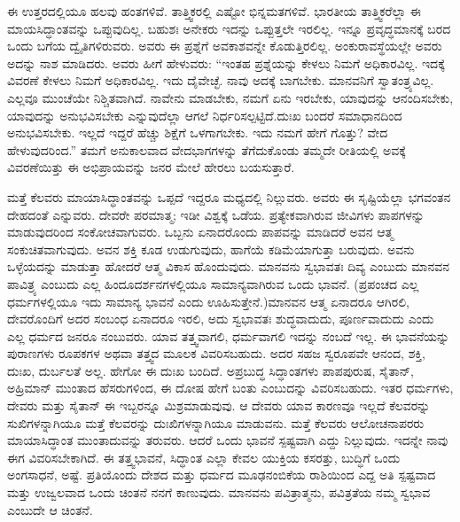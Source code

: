 \vskip 0.2cm 

ಈ ಉತ್ತರದಲ್ಲಿಯೂ ಹಲವು ಹಂತಗಳಿವೆ. ತಾತ್ತ್ವಿಕರಲ್ಲಿ ಎಷ್ಟೋ ಭಿನ್ನಮತಗಳಿವೆ. ಭಾರತೀಯ ತಾತ್ತ್ವಿಕರೆಲ್ಲಾ ಈ ಮಾಯಸಿದ್ಧಾಂತವನ್ನು ಒಪ್ಪುವುದಿಲ್ಲ. ಬಹುಶಃ ಅನೇಕರು ಇದನ್ನು ಒಪ್ಪುತ್ತಲೇ ಇರಲಿಲ್ಲ. ಇನ್ನೂ ಪ್ರವೃದ್ಧಮಾನಕ್ಕೆ ಬರದ ಒಂದು ಬಗೆಯ ದ್ವೈತಿಗಳಿರುವರು. ಅವರು ಈ ಪ್ರಶ್ನೆಗೆ ಅವಕಾಶವನ್ನೇ ಕೊಡುತ್ತಿರಲಿಲ್ಲ. ಅಂಕುರಾವಸ್ಥೆಯಲ್ಲೇ ಅವರು ಅದನ್ನು ನಾಶ ಮಾಡಿದರು. ಅವರು ಹೀಗೆ ಹೇಳುವರು: “ಇಂತಹ ಪ್ರಶ್ನೆಯನ್ನು ಕೇಳಲು ನಿಮಗೆ ಅಧಿಕಾರವಿಲ್ಲ. ಇದಕ್ಕೆ ವಿವರಣೆ ಕೇಳಲು ನಿಮಗೆ ಅಧಿಕಾರವಿಲ್ಲ. ಇದು ದೈವೇಚ್ಛೆ. ನಾವು ಅದಕ್ಕೆ ಬಾಗಬೇಕು. ಮಾನವನಿಗೆ ಸ್ವಾತಂತ್ರ್ಯವಿಲ್ಲ. ಎಲ್ಲವೂ ಮುಂಚೆಯೇ ನಿಶ್ಚಿತವಾಗಿದೆ. ನಾವೇನು ಮಾಡಬೇಕು, ನಮಗೆ ಏನು ಇರಬೇಕು, ಯಾವುದನ್ನು ಆನಂದಿಸಬೇಕು, ಯಾವುದನ್ನು ಅನುಭವಿಸಬೇಕು ಎನ್ನುವುದೆಲ್ಲಾ ಆಗಲೆ ನಿರ್ಧರಿಸಲ್ಪಟ್ಟಿದೆ.ದುಃಖ ಬಂದರೆ ಸಮಾಧಾನದಿಂದ ಅನುಭವಿಸಬೇಕು. ಇಲ್ಲದೆ ಇದ್ದರೆ ಹೆಚ್ಚು ಶಿಕ್ಷೆಗೆ ಒಳಗಾಗಬೇಕು. ಇದು ನಮಗೆ ಹೇಗೆ ಗೊತ್ತು? ವೇದ ಹೇಳುವುದರಿಂದ.” ತಮಗೆ ಅನುಕಾಲವಾದ ವೇದಭಾಗಗಳನ್ನು ತೆಗೆದುಕೊಂಡು ತಮ್ಮದೇ ರೀತಿಯಲ್ಲಿ ಅವಕ್ಕೆ ವಿವರಣೆಯಿತ್ತು ಈ ಅಭಿಪ್ರಾಯವನ್ನು ಜನರ ಮೇಲೆ ಹೇರಲು ಬಯಸುತ್ತಾರೆ.

\vskip 0.2cm 

ಮತ್ತೆ ಕೆಲವರು ಮಾಯಾಸಿದ್ಧಾಂತವನ್ನು ಒಪ್ಪದೆ ಇದ್ದರೂ ಮಧ್ಯದಲ್ಲಿ ನಿಲ್ಲುವರು. ಅವರು ಈ ಸೃಷ್ಟಿಯೆಲ್ಲಾ ಭಗವಂತನ ದೇಹದಂತೆ ಎನ್ನುವರು. ದೇವರೇ ಪರಮಾತ್ಮ; ಇಡೀ ವಿಶ್ವಕ್ಕೆ ಒಡೆಯ. ಪ್ರತ್ಯೇಕವಾಗಿರುವ ಜೀವಿಗಳು ಪಾಪಗಳನ್ನು ಮಾಡುವುದರಿಂದ ಸಂಕೋಚವಾಗುವರು. ಒಬ್ಬನು ಏನಾದರೊಂದು ಪಾಪವನ್ನು ಮಾಡಿದರೆ ಅವನ ಆತ್ಮ ಸಂಕುಚಿತವಾಗುವುದು. ಅವನ ಶಕ್ತಿ ಕೂಡ ಉಡುಗುವುದು, ಹಾಗೆಯೆ ಕಡಿಮೆಯಾಗುತ್ತಾ ಬರುವುದು. ಅವನು ಒಳ್ಳೆಯದನ್ನು ಮಾಡುತ್ತಾ ಹೋದರೆ ಆತ್ಮ ವಿಕಾಸ ಹೊಂದುವುದು. ಮಾನವನು ಸ್ವಭಾವತಃ ದಿವ್ಯ ಎಂಬುದು ಮಾನವನ ಪಾವಿತ್ರ್ಯ ಎಂಬುದು ಎಲ್ಲ ಹಿಂದೂದರ್ಶನಗಳಲ್ಲಿಯೂ ಸಾಮಾನ್ಯವಾಗಿರುವ ಒಂದು ಭಾವನೆ. (ಪ್ರಪಂಚದ ಎಲ್ಲ ಧರ್ಮಗಳಲ್ಲಿಯೂ ಇದು ಸಾಮಾನ್ಯ ಭಾವನೆ ಎಂದು ಊಹಿಸುತ್ತೇನೆ.)ಮಾನವನ ಆತ್ಮ ಏನಾದರೂ ಆಗಿರಲಿ, ದೇವರೊಂದಿಗೆ ಅದರ ಸಂಬಂಧ ಏನಾದರೂ ಇರಲಿ, ಅದು ಸ್ವಭಾವತಃ ಶುದ್ಧವಾದುದು, ಪೂರ್ಣವಾದುದು ಎಂದು ಎಲ್ಲ ಧರ್ಮದ ಜನರೂ ನಂಬುವರು. ಯಾವ ತತ್ತ್ವವಾಗಲಿ, ಧರ್ಮವಾಗಲಿ ಇದನ್ನು ನಂಬದೆ ಇಲ್ಲ. ಈ ಭಾವನೆಯನ್ನು ಪುರಾಣಗಳು ರೂಪಕಗಳ ಅಥವಾ ತತ್ತ್ವದ ಮೂಲಕ ವಿವರಿಸಬಹುದು. ಅದರ ಸಹಜ ಸ್ವರೂಪವೇ ಆನಂದ, ಶಕ್ತಿ, ದುಃಖ, ದುರ್ಬಲತೆ ಅಲ್ಲ. ಹೇಗೋ ಈ ದುಃಖ ಬಂದಿದೆ. ಅಪ್ರಬುದ್ಧ ಸಿದ್ಧಾಂತಗಳು ಪಾಪಪುರುಷ, ಸೈತಾನ್​, ಅಹ್ರಿಮಾನ್​ ಮುಂತಾದ ಹೆಸರುಗಳಿಂದ, ಈ ದೋಷ ಹೇಗೆ ಬಂತು ಎಂಬುದನ್ನು ವಿವರಿಸಬಹುದು. ಇತರ ಧರ್ಮಗಳು, ದೇವರು ಮತ್ತು ಸೈತಾನ್​ ಈ ಇಬ್ಬರನ್ನೂ ಮಿಶ್ರಮಾಡುವುವು. ಆ ದೇವರು ಯಾವ ಕಾರಣವೂ ಇಲ್ಲದೆ ಕೆಲವರನ್ನು ಸುಖಿಗಳನ್ನಾಗಿಯೂ ಮತ್ತೆ ಕೆಲವರನ್ನು ದುಃಖಿಗಳನ್ನಾಗಿಯೂ ಮಾಡುವನು. ಮತ್ತೆ ಕೆಲವರು ಆಲೋಚನಾಪರರು ಮಾಯಾಸಿದ್ಧಾಂತ ಮುಂತಾದುವನ್ನು ತರುವರು. ಆದರೆ ಒಂದು ಭಾವನೆ ಸ್ಪಷ್ಟವಾಗಿ ಎದ್ದು ನಿಲ್ಲುವುದು. ಇದನ್ನೇ ನಾವು ಈಗ ವಿವರಿಸಬೇಕಾಗಿದೆ. ಈ ತತ್ತ್ವಭಾವನೆ, ಸಿದ್ಧಾಂತ ಎಲ್ಲಾ ಕೇವಲ ಯುಕ್ತಿಯ ಕಸರತ್ತು, ಬುದ್ಧಿಗೆ ಒಂದು ಅಂಗಸಾಧನೆ, ಅಷ್ಟೆ. ಪ್ರತಿಯೊಂದು ದೇಶದ ಮತ್ತು ಧರ್ಮದ ಮೂಢನಂಬಿಕೆಯ ರಾಶಿಯಿಂದ ಎದ್ದ ಅತಿ ಸ್ಪಷ್ಟವಾದ ಮತ್ತು ಉಜ್ವಲವಾದ ಒಂದು ಚಿಂತನೆ ನನಗೆ ಕಾಣುವುದು. ಮಾನವನು ಪವಿತ್ರಾತ್ಮನು, ಪವಿತ್ರತೆಯ ನಮ್ಮ ಸ್ವಭಾವ ಎಂಬುದೇ ಆ ಚಿಂತನೆ.

\vskip 0.2cm 

